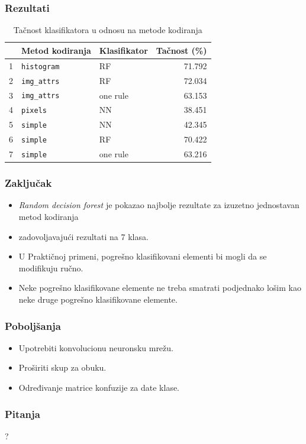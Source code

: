 \documentclass{beamer}
\begin{document}
\begin{frame}
	\frametitle{Rezultati}
	\begin{table}
		\begin{tabular}{rllr}
		 & Metod kodiranja & Klasifikator & Tačnost (\%)\\
		\hline
		1 & \texttt{histogram} & RF & 71.792\\
		2 & \texttt{img\_attrs} & RF & 72.034\\
		3 & \texttt{img\_attrs} & one rule & 63.153\\
		4 & \texttt{pixels} & NN & 38.451\\
		5 & \texttt{simple} & NN & 42.345\\
		6 & \texttt{simple} & RF & 70.422\\
		7 & \texttt{simple} & one rule & 63.216\\
		\end{tabular}
		\caption{Tačnost klasifikatora u odnosu na metode kodiranja}
	\end{table}

\end{frame}

\begin{frame}
	\frametitle{Zaključak}
	\begin{itemize}
		\item \textit{Random decision forest} je pokazao najbolje rezultate za izuzetno jednostavan metod kodiranja
		\item zadovoljavajući rezultati na 7 klasa.
		\item U Praktičnoj primeni, pogrešno klasifikovani elementi bi mogli da se modifikuju ručno.
		\item Neke pogrešno klasifikovane elemente ne treba smatrati podjednako lošim kao neke druge pogrešno klasifikovane elemente.
	\end{itemize}
\end{frame}

\begin{frame}
	\frametitle{Poboljšanja}
	\begin{itemize}
		\item Upotrebiti konvolucionu neuronsku mrežu.
		\item Proširiti skup za obuku.
		\item Određivanje matrice konfuzije za date klase.
	\end{itemize}
\end{frame}

\begin{frame}
	\frametitle{Pitanja}
	\begin{center}
		\huge{?}
	\end{center}
\end{frame}
\end{document}
